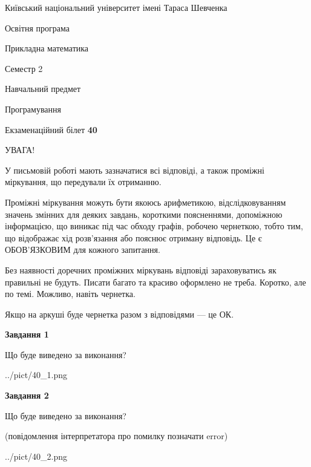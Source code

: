 \documentclass[12pt, ukrainian]{article}
\begin{document}
{{\begin {small}\par
{ \center  Київський національний університет імені Тараса Шевченка \par}
{\parbox {5 cm}{Освітня програма \hfill}{\parbox {7 cm}{Прикладна математика\hfill}}\parbox {6 cm}{\hfill Семестр 2}}\par
{\parbox {5 cm} {Навчальний предмет \hfill}\parbox {7 cm}{Програмування \hfill}\parbox {6cm}{\hfill}\par}\vspace{-7pt} \end{small}}{\center Екзаменаційний білет \No \textbf
{ 40 }\par}}
{
\begin {large}
УВАГА!

У письмовій роботі мають зазначатися всі відповіді, а також проміжні міркування, що передували їх отриманню.

Проміжні міркування можуть бути якоюсь арифметикою, відслідковуванням зна\-чень змінних для деяких завдань,
короткими поясненнями, допоміжною інформацією, що виникає під час обходу графів, робочею чернеткою,
тобто тим, що відображає хід розв’язання або пояснює отриману відповідь.
Це є ОБОВ’ЯЗКОВИМ для кожного запитання.

Без наявності доречних проміжних міркувань відповіді зараховуватись як правиль\-ні не будуть.
Писати багато та красиво оформлено не треба. Коротко, але по темі. Можли\-во, навіть чернетка.

Якщо на аркуші буде чернетка разом з відповідями --- це ОК.

\newpage

{\begin {center}\textbf{Завдання 1}\end {center}}\par
Що буде виведено за виконання?\par
\begin{center}
	{../pict/40_1.png}
\end{center}
\newpage

{\begin {center}\textbf{Завдання 2}\end {center}}\par
Що буде виведено за виконання?\par
 (повідомлення інтерпретатора про помилку позначати error)\par
\begin{center}
	{../pict/40_2.png}
\end{center}
\newpage


\end{large}}
\end{document}
